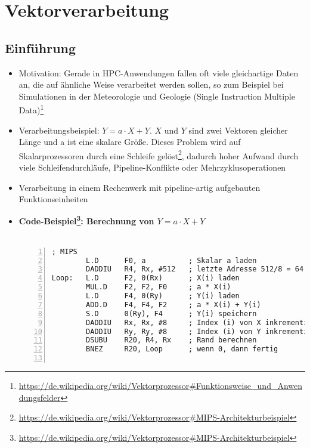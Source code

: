 \chapter{Vektorverarbeitung}

\section{Einführung}
\begin{itemize}
	\item Motivation: Gerade in HPC-Anwendungen fallen oft viele gleichartige Daten an, die auf ähnliche Weise verarbeitet werden sollen, so zum Beispiel bei Simulationen in der Meteorologie und Geologie (Single Instruction Multiple Data)\footnote{\url{https://de.wikipedia.org/wiki/Vektorprozessor\#Funktionsweise_und_Anwendungsfelder}}
	\item Verarbeitungsbeispiel: \(Y = a \cdot X + Y\). \(X\) und \(Y\) sind zwei Vektoren gleicher Länge und a ist eine skalare Größe. Dieses Problem wird auf Skalarprozessoren durch eine Schleife gelöst\footnote{\url{https://de.wikipedia.org/wiki/Vektorprozessor\#MIPS-Architekturbeispiel}}, dadurch hoher Aufwand durch viele Schleifendurchläufe, Pipeline-Konflikte oder Mehrzyklusoperationen
	\item Verarbeitung in einem Rechenwerk mit pipeline-artig aufgebauten Funktionseinheiten
	\item \textbf{Code-Beispiel\footnote{\url{https://de.wikipedia.org/wiki/Vektorprozessor\#MIPS-Architekturbeispiel}}: Berechnung von \(Y = a \cdot X + Y\)}\\\\
	\begin{minipage}{\linewidth}
	\begin{lstlisting}[frame=single,numbers=left,mathescape,language={[mips]Assembler},tabsize=4]
; MIPS
		L.D 	 F0, a          ; Skalar a laden
		DADDIU	 R4, Rx, #512   ; letzte Adresse 512/8 = 64
Loop:	L.D 	 F2, 0(Rx)  	; X(i) laden
		MUL.D    F2, F2, F0     ; a * X(i)
		L.D      F4, 0(Ry)      ; Y(i) laden
		ADD.D    F4, F4, F2     ; a * X(i) + Y(i)
		S.D      0(Ry), F4      ; Y(i) speichern
		DADDIU   Rx, Rx, #8     ; Index (i) von X inkrementieren
		DADDIU   Ry, Ry, #8     ; Index (i) von Y inkrementieren
		DSUBU    R20, R4, Rx    ; Rand berechnen
		BNEZ     R20, Loop      ; wenn 0, dann fertig


\end{lstlisting}
\end{minipage}
\end{itemize}

